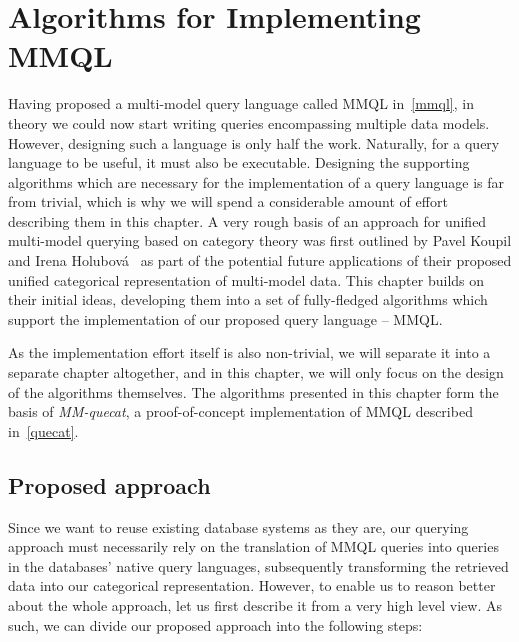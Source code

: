 \chapter{Algorithms for Implementing MMQL}
\label{algorithms}

Having proposed a multi-model query language called MMQL in~\cref{mmql}, in theory we could now start writing queries encompassing multiple data models.
However, designing such a language is only half the work.
Naturally, for a query language to be useful, it must also be executable.
Designing the supporting algorithms which are necessary for the implementation of a query language is far from trivial, which is why we will spend a considerable amount of effort describing them in this chapter.
A very rough basis of an approach for unified multi-model querying based on category theory was first outlined by Pavel Koupil and Irena Holubov{\'a}~\cite{unified_representation} as part of the potential future applications of their proposed unified categorical representation of multi-model data.
This chapter builds on their initial ideas, developing them into a set of fully-fledged algorithms which support the implementation of our proposed query language -- MMQL.

As the implementation effort itself is also non-trivial, we will separate it into a separate chapter altogether, and in this chapter, we will only focus on the design of the algorithms themselves.
The algorithms presented in this chapter form the basis of \textit{MM-quecat}, a proof-of-concept implementation of MMQL described in~\cref{quecat}.

\section{Proposed approach}
\label{algorithms:section:approach}

Since we want to reuse existing database systems as they are, our querying approach must necessarily rely on the translation of MMQL queries into queries in the databases' native query languages, subsequently transforming the retrieved data into our categorical representation.
However, to enable us to reason better about the whole approach, let us first describe it from a very high level view.
As such, we can divide our proposed approach into the following steps:

